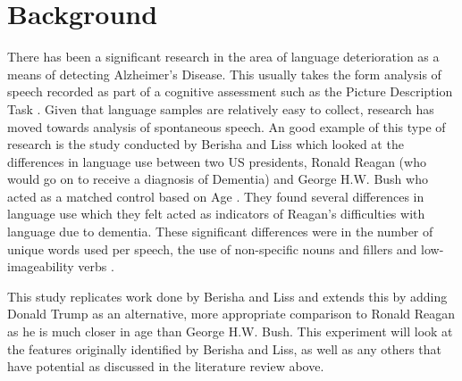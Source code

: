 \documentclass[10pt, letterpaper, twoside, openany]{thesis}
\begin{document}
\section{Background}
There has been a significant research in the area of language deterioration as a means of detecting Alzheimer's Disease. This usually takes the form analysis of speech recorded as part of a cognitive assessment such as the Picture Description Task \cite{Orimaye2014,Fraser2015}. Given that language samples are relatively easy to collect, research has moved towards analysis of spontaneous speech. An good example of this type of research is the study conducted by Berisha and Liss which looked at the differences in language use between two US presidents, Ronald Reagan (who would go on to receive a diagnosis of Dementia) and George H.W. Bush who acted as a matched control based on Age \cite{Berisha2015}. They found several differences in language use which they felt acted as indicators of Reagan's difficulties with language due to dementia. These significant differences were in the number of unique words used per speech, the use of non-specific nouns and fillers and low-imageability verbs \cite{Berisha2015}. 
\par   
This study replicates work done by Berisha and Liss and extends this by adding Donald Trump as an alternative, more appropriate comparison to Ronald Reagan as he is much closer in age than George H.W. Bush. This experiment will look at the features originally identified by Berisha and Liss, as well as any others that have potential as discussed in the literature review above. 
\end{document}
